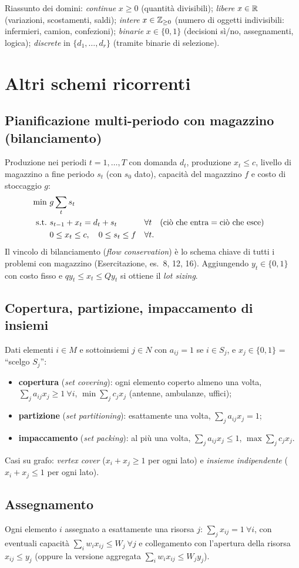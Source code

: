\begin{esame}
Riassunto dei domini: \emph{continue} $x\ge0$ (quantità divisibili); \emph{libere} $x\in\mathbb{R}$ (variazioni, scostamenti, saldi); \emph{intere} $x\in\mathbb{Z}_{\ge0}$ (numero di oggetti indivisibili: infermieri, camion, confezioni); \emph{binarie} $x\in\{0,1\}$ (decisioni sì/no, assegnamenti, logica); \emph{discrete} in $\{d_1,\dots,d_r\}$ (tramite binarie di selezione).
\end{esame}

\section{Altri schemi ricorrenti}

\subsection{Pianificazione multi-periodo con magazzino (bilanciamento)}
Produzione nei periodi $t=1,\dots,T$ con domanda $d_t$, produzione $x_t\le c$, livello di magazzino a fine periodo $s_t$ (con $s_0$ dato), capacità del magazzino $f$ e costo di stoccaggio $g$:
\begin{align*}
\min\ & g\sum_t s_t\\
\text{s.t.}\ & s_{t-1}+x_t=d_t+s_t && \forall t \quad(\text{ciò che entra} = \text{ciò che esce})\\
& 0\le x_t\le c,\quad 0\le s_t\le f && \forall t.
\end{align*}
Il vincolo di bilanciamento (\emph{flow conservation}) è lo schema chiave di tutti i problemi con magazzino (Esercitazione, es.\ 8, 12, 16). Aggiungendo $y_t\in\{0,1\}$ con costo fisso e $qy_t\le x_t\le Qy_t$ si ottiene il \emph{lot sizing}.

\subsection{Copertura, partizione, impaccamento di insiemi}
Dati elementi $i\in M$ e sottoinsiemi $j\in N$ con $a_{ij}=1$ se $i\in S_j$, e $x_j\in\{0,1\}$ = ``scelgo $S_j$'':
\begin{itemize}[nosep]
\item \textbf{copertura} (\emph{set covering}): ogni elemento coperto almeno una volta, $\sum_j a_{ij}x_j\ge1\ \forall i$, $\min\sum_jc_jx_j$ (antenne, ambulanze, uffici);
\item \textbf{partizione} (\emph{set partitioning}): esattamente una volta, $\sum_j a_{ij}x_j=1$;
\item \textbf{impaccamento} (\emph{set packing}): al più una volta, $\sum_ja_{ij}x_j\le1$, $\max\sum_jc_jx_j$.
\end{itemize}
Casi su grafo: \emph{vertex cover} ($x_i+x_j\ge1$ per ogni lato) e \emph{insieme indipendente} ($x_i+x_j\le1$ per ogni lato).

\subsection{Assegnamento}
Ogni elemento $i$ assegnato a esattamente una risorsa $j$: $\sum_jx_{ij}=1\ \forall i$, con eventuali capacità $\sum_iw_ix_{ij}\le W_j\ \forall j$ e collegamento con l'apertura della risorsa $x_{ij}\le y_j$ (oppure la versione aggregata $\sum_iw_ix_{ij}\le W_jy_j$).
